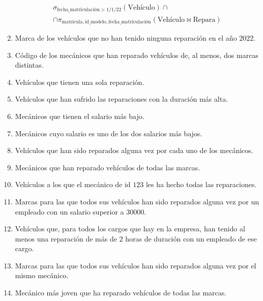 \begin{ejercicio}
\begin{enumerate}
\begin{multline*}
            \sigma_{\text{fecha\_matriculación} > 1/1/22}(\text{Vehículo}) \cap\\ \cap \pi_{\text{matrícula},\text{id\_modelo}, \text{fecha\_matriculación}}(\text{Vehículo}\bowtie \text{Repara})
        \end{multline*}
        \item Marca de los vehículos que no han tenido ninguna reparación en el año $2022$.
        \item Código de los mecánicos que han reparado vehículos de, al menos, dos marcas distintas.
        \item Vehículos que tienen una sola reparación.
        \item Vehículos que han sufrido las reparaciones con la duración más alta.
        \item Mecánicos que tienen el salario más bajo.
        \item Mecánicos cuyo salario es uno de los dos salarios más bajos.
        \item Vehículos que han sido reparados alguna vez por cada uno de los mecánicos.
        \item Mecánicos que han reparado vehículos de todas las marcas.
        \item Vehículos a los que el mecánico de id $123$ les ha hecho todas las reparaciones.
        \item Marcas para las que todos sus vehículos han sido reparados alguna vez por un empleado con un salario superior a $30000$.
        \item Vehículos que, para todos los cargos que hay en la empresa, han tenido al menos una reparación de más de $2$ horas de duración con un empleado de ese cargo.
        \item Marcas para las que todos sus vehículos han sido reparados alguna vez por el mismo mecánico.
        \item Mecánico más joven que ha reparado vehículos de todas las marcas.
    \end{enumerate}

\end{ejercicio}




